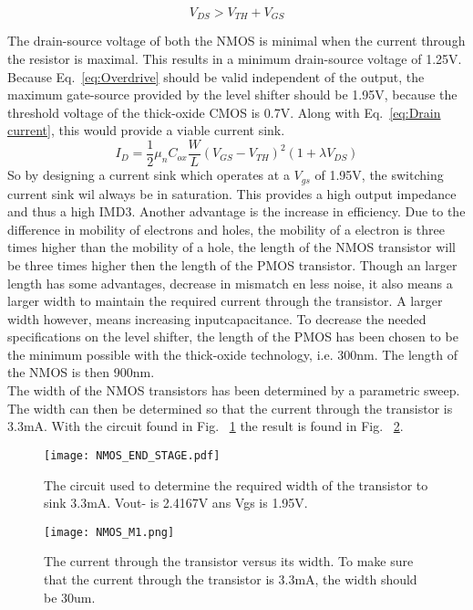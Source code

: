 \begin{equation}\label{eq:Overdrive}{V_{DS} > V_{TH} + V_{GS}}\end{equation}

The drain-source voltage of both the NMOS is minimal when the current through the resistor is maximal. This results in a minimum drain-source voltage of 1.25V. Because Eq.~\ref{eq:Overdrive} should be valid independent of the output, the maximum gate-source provided by the level shifter should be 1.95V, because the threshold voltage of the thick-oxide CMOS is 0.7V. Along with Eq.~\ref{eq:Drain current}, this would provide a viable current sink.
\begin{equation}{I_D = \frac{1}{2}\mu_n C_{ox}\frac{W}{L}(V_{GS}-V_{TH})^2(1+\lambda V_{DS})}\label{eq:Drain current}\end{equation}
So by designing a current sink which operates at a $V_{gs}$ of 1.95V, the  switching current sink wil always be in saturation. This provides a high output impedance and thus a high IMD3. Another advantage is the increase in efficiency.
Due to the difference in mobility of electrons and holes, the mobility of a electron is three times higher than the mobility of a hole, the length of the NMOS transistor will be three times higher then the length of the PMOS transistor. Though an larger length has some advantages, decrease in mismatch en less noise, it also means a larger width to maintain the required current through the transistor. A larger width however, means increasing inputcapacitance. To decrease the needed specifications on the level shifter, the length of the PMOS has been chosen to be the minimum possible with the thick-oxide technology, i.e. 300nm. The length of the NMOS is then 900nm.\\
The width of the NMOS transistors has been determined by a parametric sweep. The width can then be determined so that the current through the transistor is 3.3mA. With the circuit found in Fig. ~\ref{fig:NMOS_Width_Sweep} the result is found in Fig. ~\ref{fig:NMOS_Width_Sweep_Result}.
\begin{figure}
\begin{center}
\texttt{[image: NMOS\_END\_STAGE.pdf]}
\caption{The circuit used to determine the required width of the transistor to sink 3.3mA. Vout- is 2.4167V ans Vgs is 1.95V.}
\label{fig:NMOS_Width_Sweep}
\end{center}
\end{figure}

\begin{figure}
\begin{center}
\texttt{[image: NMOS\_M1.png]}
\caption{The current through the transistor versus its width. To make sure that the current through the transistor is 3.3mA, the width should be 30um.}
\label{fig:NMOS_Width_Sweep_Result}
\end{center}
\end{figure}

